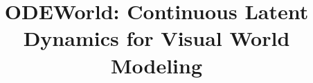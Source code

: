 \documentclass{ecai}
\newcommand{\method}{ODEWorld}
\begin{document}
\begin{frontmatter}

\title{\method{}: Continuous Latent Dynamics for Visual World Modeling}

\author[A]{~}
\address[A]{Independent / AutoConference}

\begin{abstract}

\end{abstract}

\end{frontmatter}








\end{document}

